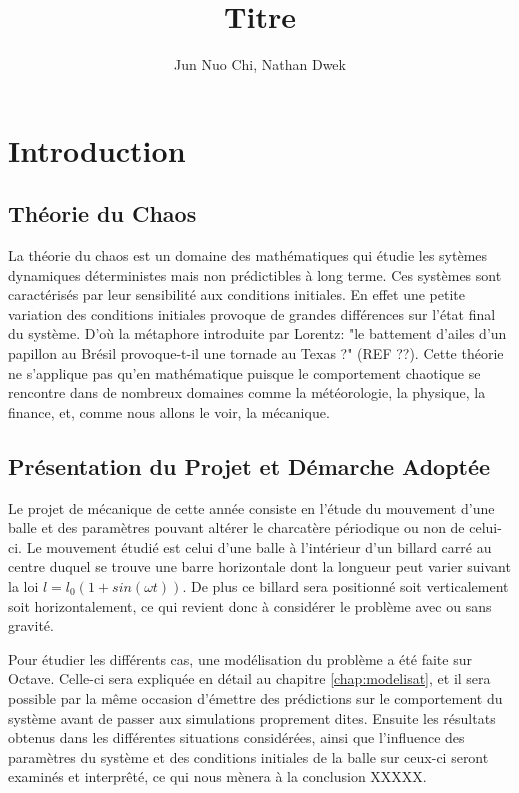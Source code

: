 \documentclass[a4paper]{report}
\title{Titre}
\author{Jun Nuo Chi, Nathan Dwek}
\begin{document}
\maketitle
\tableofcontents
\begin{abstract}

\end{abstract}

\chapter{Introduction}

\section{Théorie du Chaos}
La théorie du chaos est un domaine des mathématiques qui étudie les sytèmes dynamiques déterministes mais non prédictibles à long terme. Ces systèmes sont caractérisés par leur sensibilité aux conditions initiales. En effet une petite variation des conditions initiales provoque de grandes différences sur l'état final du système. D'où la métaphore introduite par Lorentz: "le battement d'ailes d'un papillon au Brésil provoque-t-il une tornade au Texas ?" (REF ??). Cette théorie ne s'applique pas qu'en mathématique puisque le comportement chaotique se rencontre dans de nombreux domaines comme la météorologie, la physique, la finance, et, comme nous allons le voir, la mécanique.

\section{Présentation du Projet et Démarche Adoptée}
Le projet de mécanique de cette année consiste en l'étude du mouvement d'une balle et des paramètres pouvant altérer le charcatère périodique ou non de celui-ci. Le mouvement étudié est celui d'une balle à l'intérieur d'un billard carré au centre duquel se  trouve une barre horizontale dont la longueur peut varier suivant la loi \(l=l_0(1+sin(\omega t)) \). De plus ce billard sera positionné soit verticalement soit horizontalement, ce qui revient donc à considérer le problème avec ou sans gravité.

Pour étudier les différents cas, une modélisation du problème a été faite sur Octave.  Celle-ci sera expliquée en détail au chapitre \ref{chap:modelisat}, et il sera possible par la même occasion d'émettre des prédictions sur le comportement du système avant de passer aux simulations proprement dites. Ensuite les résultats obtenus dans les différentes situations considérées, ainsi que l'influence des paramètres du système et des conditions initiales de la balle sur ceux-ci seront examinés et interprêté, ce qui nous mènera à la conclusion XXXXX.
\end{document}
